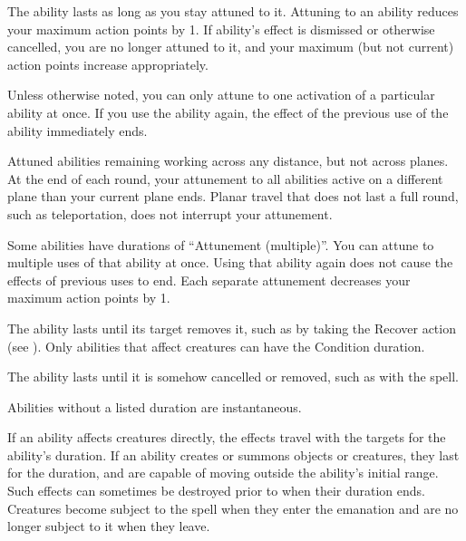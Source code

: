         \label{Attunement} The ability lasts as long as you stay attuned to it.
        Attuning to an ability reduces your maximum action points by 1.
        If ability's effect is dismissed or otherwise cancelled, you are no longer attuned to it, and your maximum (but not current) action points increase appropriately.

        Unless otherwise noted, you can only attune to one activation of a particular ability at once.
        If you use the ability again, the effect of the previous use of the ability immediately ends.

        Attuned abilities remaining working across any distance, but not across planes.
        At the end of each round, your attunement to all abilities active on a different plane than your current plane ends.
        Planar travel that does not last a full round, such as teleportation, does not interrupt your attunement.

         Some abilities have durations of ``Attunement (multiple)''.
        You can attune to multiple uses of that ability at once.
        Using that ability again does not cause the effects of previous uses to end.
        Each separate attunement decreases your maximum action points by 1.

         The ability lasts until its target removes it, such as by taking the Recover action (see ).
        Only abilities that affect creatures can have the Condition duration.

         The ability lasts until it is somehow cancelled or removed, such as with the  spell.

         Abilities without a listed duration are instantaneous.

         If an ability affects creatures directly, the effects travel with the targets for the ability's duration.
        If an ability creates or summons objects or creatures, they last for the duration, and are capable of moving outside the ability's initial range.
        Such effects can sometimes be destroyed prior to when their duration ends.
        Creatures become subject to the spell when they enter the emanation and are no longer subject to it when they leave.

